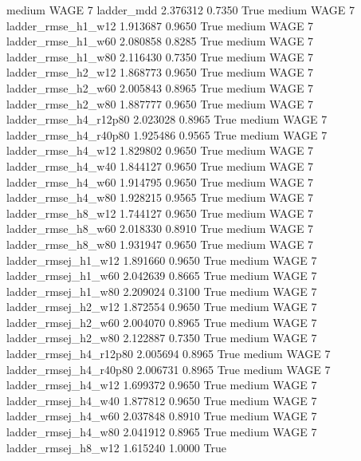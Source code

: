     medium     WAGE                 7             ladder_mdd   2.376312      0.7350    True
    medium     WAGE                 7     ladder_rmse_h1_w12   1.913687      0.9650    True
    medium     WAGE                 7     ladder_rmse_h1_w60   2.080858      0.8285    True
    medium     WAGE                 7     ladder_rmse_h1_w80   2.116430      0.7350    True
    medium     WAGE                 7     ladder_rmse_h2_w12   1.868773      0.9650    True
    medium     WAGE                 7     ladder_rmse_h2_w60   2.005843      0.8965    True
    medium     WAGE                 7     ladder_rmse_h2_w80   1.887777      0.9650    True
    medium     WAGE                 7  ladder_rmse_h4_r12p80   2.023028      0.8965    True
    medium     WAGE                 7  ladder_rmse_h4_r40p80   1.925486      0.9565    True
    medium     WAGE                 7     ladder_rmse_h4_w12   1.829802      0.9650    True
    medium     WAGE                 7     ladder_rmse_h4_w40   1.844127      0.9650    True
    medium     WAGE                 7     ladder_rmse_h4_w60   1.914795      0.9650    True
    medium     WAGE                 7     ladder_rmse_h4_w80   1.928215      0.9565    True
    medium     WAGE                 7     ladder_rmse_h8_w12   1.744127      0.9650    True
    medium     WAGE                 7     ladder_rmse_h8_w60   2.018330      0.8910    True
    medium     WAGE                 7     ladder_rmse_h8_w80   1.931947      0.9650    True
    medium     WAGE                 7    ladder_rmsej_h1_w12   1.891660      0.9650    True
    medium     WAGE                 7    ladder_rmsej_h1_w60   2.042639      0.8665    True
    medium     WAGE                 7    ladder_rmsej_h1_w80   2.209024      0.3100    True
    medium     WAGE                 7    ladder_rmsej_h2_w12   1.872554      0.9650    True
    medium     WAGE                 7    ladder_rmsej_h2_w60   2.004070      0.8965    True
    medium     WAGE                 7    ladder_rmsej_h2_w80   2.122887      0.7350    True
    medium     WAGE                 7 ladder_rmsej_h4_r12p80   2.005694      0.8965    True
    medium     WAGE                 7 ladder_rmsej_h4_r40p80   2.006731      0.8965    True
    medium     WAGE                 7    ladder_rmsej_h4_w12   1.699372      0.9650    True
    medium     WAGE                 7    ladder_rmsej_h4_w40   1.877812      0.9650    True
    medium     WAGE                 7    ladder_rmsej_h4_w60   2.037848      0.8910    True
    medium     WAGE                 7    ladder_rmsej_h4_w80   2.041912      0.8965    True
    medium     WAGE                 7    ladder_rmsej_h8_w12   1.615240      1.0000    True
